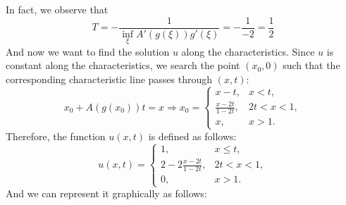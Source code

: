 In fact, we observe that
\[
    T = - \frac{1}{\inf_\xi A'(g(\xi))g'(\xi)} = - \frac{1}{-2} = \frac{1}{2}
\]
And now we want to find the solution $u$ along the characteristics. Since $u$
is constant along the characteristics, we search the point \((x_0, 0)\) such
that the corresponding characteristic line passes through \((x, t)\):
\[
    x_0 + A(g(x_0))t = x \Rightarrow x_0 = \begin{cases}
        x - t,                 & x < t,      \\
        \frac{x - 2t}{1 - 2t}, & 2t < x < 1, \\
        x,                     & x > 1.
    \end{cases}
\]
Therefore, the function \(u(x,t)\) is defined as follows:
\[
    u(x,t) = \begin{cases}
        1,                        & x \leq t,   \\
        2-2\frac{x - 2t}{1 - 2t}, & 2t < x < 1, \\
        0,                        & x > 1.
    \end{cases}
\]
And we can represent it graphically as follows:
\begin{center}
\end{center}
